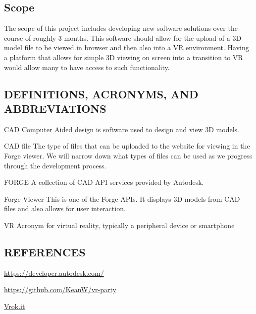 \documentclass[letterpaper, 10pt, draftclsnofoot, compsoc, onecolumn]{IEEEtran}
\begin{document}
\subsection{Scope}
	The scope of this project includes developing new software solutions over the course of roughly 3 months. This software
 	should allow for the upload of a 3D model file to be viewed in browser and then also into a VR environment. Having a 
	platform that allows for simple 3D viewing on screen into a transition to VR would allow many to have access to such 
	functionality. 

\subsection{DEFINITIONS, ACRONYMS, AND ABBREVIATIONS}
	\begin{description}
	\item{CAD} Computer Aided design is software used to design and view 3D models.

	\item{CAD file} The type of files that can be uploaded to the website for viewing in the Forge viewer.
	We will  narrow down what types of files can be used as we progress through the development process.

	\item{FORGE} A collection of CAD API services provided by Autodesk.

	\item{Forge Viewer} This is one of the Forge APIs. It displays 3D models from CAD files and also allows
	for user interaction.

	\item{VR} Acronym for virtual reality, typically a peripheral device or smartphone
	\end{description} 
	
\subsection{REFERENCES}
	\begin{flushleft}
	\url{https://developer.autodesk.com/}\newline

	\url{https://github.com/KeanW/vr-party}\newline

	\url{Vrok.it}\newline
	\end{flushleft}
\end{document}
